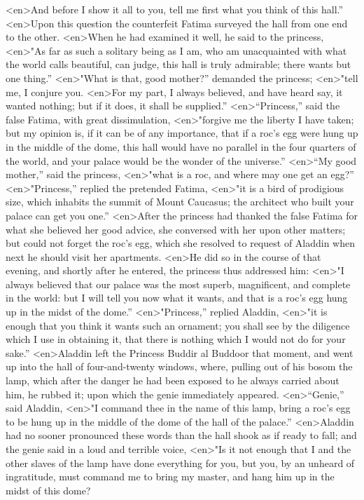 <en>And before I show it all to you, tell me first what you think of this hall.”
<en>Upon this question the counterfeit Fatima surveyed the hall from one end to the other.
<en>When he had examined it well, he said to the princess,
<en>"As far as such a solitary being as I am, who am unacquainted with what the world calls beautiful, can judge, this hall is truly admirable; there wants but one thing.”
<en>"What is that, good mother?” demanded the princess;
<en>"tell me, I conjure you.
<en>For my part, I always believed, and have heard say, it wanted nothing; but if it does, it shall be supplied.”
<en>“Princess,” said the false Fatima, with great dissimulation,
<en>"forgive me the liberty I have taken; but my opinion is, if it can be of any importance, that if a roc’s egg were hung up in the middle of the dome, this hall would have no parallel in the four quarters of the world, and your palace would be the wonder of the universe.”
<en>“My good mother,” said the princess,
<en>"what is a roc, and where may one get an egg?”
<en>"Princess,” replied the pretended Fatima,
<en>"it is a bird of prodigious size, which inhabits the summit of Mount Caucasus; the architect who built your palace can get you one.”
<en>After the princess had thanked the false Fatima for what she believed her good advice, she conversed with her upon other matters; but could not forget the roc’s egg, which she resolved to request of Aladdin when next he should visit her apartments.
<en>He did so in the course of that evening, and shortly after he entered, the princess thus addressed him:
<en>"I always believed that our palace was the most superb, magnificent, and complete in the world: but I will tell you now what it wants, and that is a roc’s egg hung up in the midst of the dome.”
<en>"Princess,” replied Aladdin,
<en>"it is enough that you think it wants such an ornament; you shall see by the diligence which I use in obtaining it, that there is nothing which I would not do for your sake.”
<en>Aladdin left the Princess Buddir al Buddoor that moment, and went up into the hall of four-and-twenty windows, where, pulling out of his bosom the lamp, which after the danger he had been exposed to he always carried about him, he rubbed it; upon which the genie immediately appeared.
<en>“Genie,” said Aladdin,
<en>"I command thee in the name of this lamp, bring a roc’s egg to be hung up in the middle of the dome of the hall of the palace.”
<en>Aladdin had no sooner pronounced these words than the hall shook as if ready to fall; and the genie said in a loud and terrible voice,
<en>"Is it not enough that I and the other slaves of the lamp have done everything for you, but you, by an unheard of ingratitude, must command me to bring my master, and hang him up in the midst of this dome?
